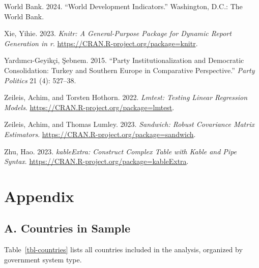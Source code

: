 \documentclass[
  letterpaper,
  DIV=11,
  numbers=noendperiod]{scrartcl}
\newlength{\cslhangindent}
\newenvironment{CSLReferences}[2] %
 {\begin{list}{}{%
  \setlength{\itemindent}{0pt}
  \setlength{\leftmargin}{0pt}
  \setlength{\parsep}{0pt}
  \ifodd #1
   \setlength{\leftmargin}{\cslhangindent}
   \setlength{\itemindent}{-1\cslhangindent}
  \fi
  \setlength{\itemsep}{#2\baselineskip}}}
 {\end{list}}
\begin{document}
\begin{CSLReferences}{1}{0}
World Bank. 2024. {``World Development Indicators.''} Washington, D.C.:
The World Bank.

Xie, Yihie. 2023. \emph{Knitr: A General-Purpose Package for Dynamic
Report Generation in r}. \url{https://CRAN.R-project.org/package=knitr}.

Yardımcı-Geyikçi, Şebnem. 2015. {``Party Institutionalization and
Democratic Consolidation: Turkey and Southern Europe in Comparative
Perspective.''} \emph{Party Politics} 21 (4): 527--38.

Zeileis, Achim, and Torsten Hothorn. 2022. \emph{Lmtest: Testing Linear
Regression Models}. \url{https://CRAN.R-project.org/package=lmtest}.

Zeileis, Achim, and Thomas Lumley. 2023. \emph{Sandwich: Robust
Covariance Matrix Estimators}.
\url{https://CRAN.R-project.org/package=sandwich}.

Zhu, Hao. 2023. \emph{kableExtra: Construct Complex Table with Kable and
Pipe Syntax}. \url{https://CRAN.R-project.org/package=kableExtra}.

\end{CSLReferences}

\newpage

\section{Appendix}\label{appendix}

\subsection{A. Countries in Sample}\label{a.-countries-in-sample}

Table~\ref{tbl-countries} lists all countries included in the analysis,
organized by government system type.

\begingroup\fontsize{8}{10}\selectfont
\end{document}
